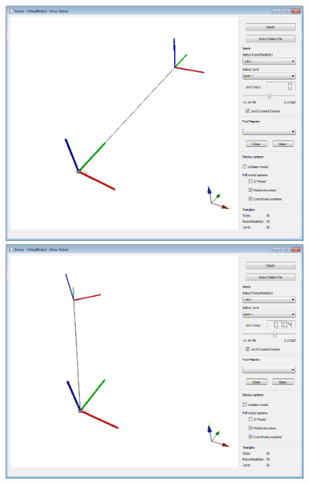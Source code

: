 \begin{figure}[H]
	\centering
	\begin{minipage} {.45\linewidth}
	  \includegraphics[width=\linewidth]{Tutorial3a}
	\end{minipage}
	\begin{minipage} {.45\linewidth}
	  \includegraphics[width=\linewidth]{Tutorial3b}
	\end{minipage}
\end{figure}

\par

